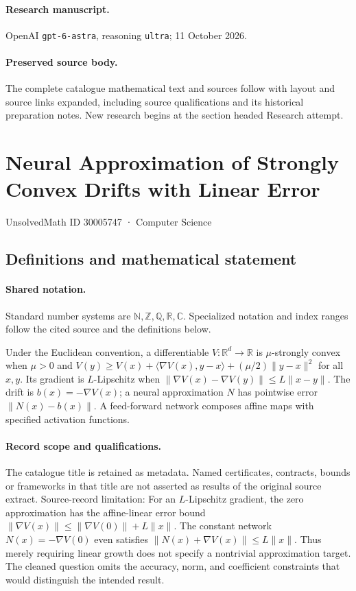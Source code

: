 \documentclass[11pt]{article}
\begin{document}
\paragraph{Research manuscript.} OpenAI \texttt{gpt-6-astra}, reasoning \texttt{ultra}; 11 October 2026.
\paragraph{Preserved source body.} The complete catalogue mathematical text and sources follow with layout and source links expanded, including source qualifications and its historical preparation notes. New research begins at the section headed Research attempt.

\section{Neural Approximation of Strongly Convex Drifts with Linear Error}\label{30005747}
{\small UnsolvedMath ID 30005747 · Computer Science}
\subsection{Definitions and mathematical statement}

\paragraph{Shared notation.}Standard number systems are $\mathbb N,\mathbb Z,\mathbb Q,\mathbb R,\mathbb C$. Specialized notation and index ranges follow the cited source and the definitions below.


Under the Euclidean convention, a differentiable $V:\mathbb R^d\to\mathbb R$ is $\mu$-strongly convex when $\mu>0$ and $V(y)\ge V(x)+\langle\nabla V(x),y-x\rangle+(\mu/2)\|y-x\|^2$ for all $x,y$. Its gradient is $L$-Lipschitz when $\|\nabla V(x)-\nabla V(y)\|\le L\|x-y\|$. The drift is $b(x)=-\nabla V(x)$; a neural approximation $N$ has pointwise error $\|N(x)-b(x)\|$. A feed-forward network composes affine maps with specified activation functions.
\paragraph{Record scope and qualifications.}
The catalogue title is retained as metadata. Named certificates, contracts, bounds or frameworks in that title are not asserted as results of the original source extract.
Source-record limitation: For an $L$-Lipschitz gradient, the zero approximation has the affine-linear error bound $\|\nabla V(x)\|\le\|\nabla V(0)\|+L\|x\|$. The constant network $N(x)=-\nabla V(0)$ even satisfies $\|N(x)+\nabla V(x)\|\le L\|x\|$. Thus merely requiring linear growth does not specify a nontrivial approximation target. The cleaned question omits the accuracy, norm, and coefficient constraints that would distinguish the intended result.
\end{document}
